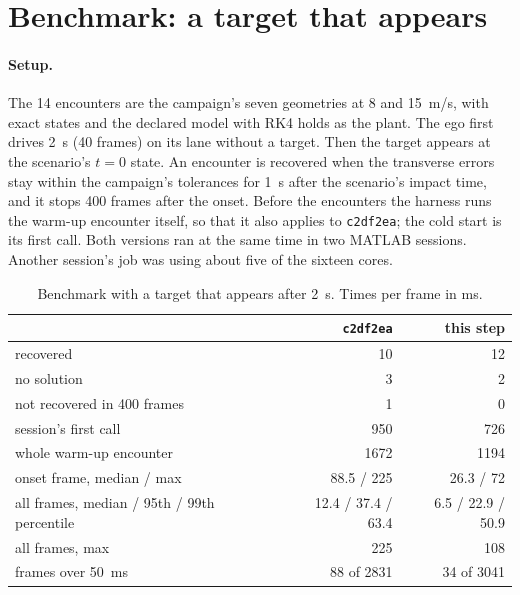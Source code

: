 \documentclass[11pt]{article}
\begin{document}
\section{Benchmark: a target that appears}
\paragraph{Setup.}
The 14 encounters are the campaign's seven geometries at 8 and 15~m/s,
with exact states and the declared model with RK4 holds as the plant. The
ego first drives 2~s (40 frames) on its lane without a target. Then the
target appears at the scenario's $t=0$ state. An encounter is recovered when
the transverse errors stay within the campaign's tolerances for 1~s after
the scenario's impact time, and it stops 400 frames after the onset. Before
the encounters the harness runs the warm-up encounter itself, so that it
also applies to \texttt{c2df2ea}; the cold start is its first call. Both
versions ran at the same time in two MATLAB sessions. Another session's job
was using about five of the sixteen cores.

\begin{table}[h]
\centering\small
\caption{Benchmark with a target that appears after 2~s. Times per frame
in ms.}
\begin{tabular}{lrr}
\toprule
 & \texttt{c2df2ea} & this step\\
\midrule
recovered & 10 & 12\\
no solution & 3 & 2\\
not recovered in 400 frames & 1 & 0\\
session's first call & 950 & 726\\
whole warm-up encounter & 1672 & 1194\\
onset frame, median / max & 88.5 / 225 & 26.3 / 72\\
all frames, median / 95th / 99th percentile & 12.4 / 37.4 / 63.4 & 6.5 / 22.9 / 50.9\\
all frames, max & 225 & 108\\
frames over 50~ms & 88 of 2831 & 34 of 3041\\
\bottomrule
\end{tabular}
\end{table}
\end{document}
